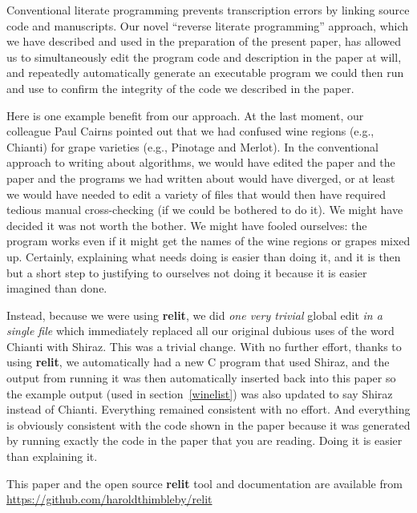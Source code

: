 \documentclass[12pt]{article}
\def\name#1{\textbf{#1}}
\begin{document}
Conventional literate programming prevents transcription errors by linking source code and manuscripts. Our novel ``reverse literate programming'' approach, which we have described and used in the preparation of the present paper, has allowed us to simultaneously edit the program code and description in the paper at will, and repeatedly automatically generate an executable program we could then run and use to confirm the integrity of the code we described in the paper. 

Here is one example benefit from our approach. At the last moment, our colleague Paul Cairns pointed out that we had confused wine regions (e.g., Chianti) for grape varieties (e.g., Pinotage and Merlot). In the conventional approach to writing about algorithms, we would have edited the paper and the paper and the programs we had written about would have diverged, or at least we would have needed to edit a variety of files that would then have required tedious manual cross-checking (if we could be bothered to do it). We might have decided it was not worth the bother. We might have fooled ourselves: the program works even if it might get the names of the wine regions or grapes mixed up. Certainly, explaining what needs doing is easier than doing it, and it is then but a short step to justifying to ourselves not doing it because it is easier imagined than done.

Instead, because we were using \name{relit}, we did \emph{one very trivial\/} global edit \emph{in a single file\/} which immediately replaced all our original dubious uses of the word Chianti with Shiraz. This was a trivial change. With no further effort, thanks to using \name{relit}, we automatically had a new C program that used Shiraz, and the output from running it was then automatically inserted back into this paper so the example output (used in section~\ref{winelist}) was also updated to say Shiraz instead of Chianti. Everything remained consistent with no effort. And everything is obviously consistent with the code shown in the paper because it was generated by running exactly the code in the paper that you are reading. Doing it is easier than explaining it.

This paper and the open source \name{relit} tool and documentation are available from \url{https://github.com/haroldthimbleby/relit}

\end{document}
